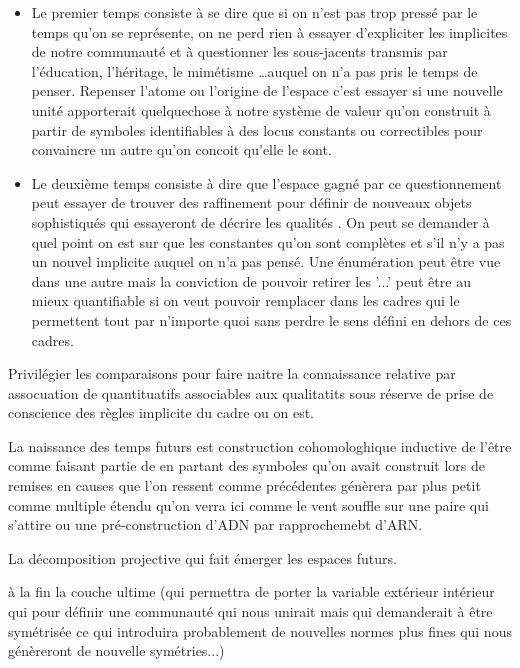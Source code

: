 \documentclass{article}
\begin{document}
\begin{itemize}
\item Le premier temps consiste à se dire que si on n'est pas trop pressé par le temps qu'on se représente, on ne perd rien à essayer d'expliciter  les implicites de notre communauté et à questionner les sous-jacents transmis par l'éducation, l'héritage, le mimétisme \ldots  auquel on n'a pas pris le temps de penser. 
 Repenser l'atome ou l'origine de l'espace c'est essayer si une nouvelle unité apporterait  quelquechose à notre système de valeur qu'on construit à partir de symboles identifiables à des locus constants ou correctibles pour convaincre un autre qu'on concoit  qu'elle le sont.
 \item Le deuxième temps consiste à dire que l'espace gagné par ce questionnement peut essayer de trouver des raffinement pour définir de nouveaux 
objets sophistiqués qui essayeront de décrire les qualités . On peut se demander à quel point on est sur que les constantes qu'on sont complètes et s'il n'y a pas un nouvel implicite auquel on n'a pas pensé. Une énumération peut être vue dans une autre mais la conviction de pouvoir retirer les '...' peut être au mieux quantifiable si on veut pouvoir remplacer dans les cadres qui le permettent tout par n'importe quoi sans perdre le sens défini en dehors de ces cadres.
\end{itemize}

Privilégier les comparaisons pour faire naitre la connaissance relative par assocuation de quantituatifs associables aux qualitatits sous réserve de prise de conscience des règles implicite du cadre ou on est.


La naissance des temps futurs est  construction cohomologhique inductive de l'être comme faisant partie de en partant des symboles qu'on avait construit lors de remises en causes que l'on ressent comme précédentes génèrera par plus petit comme multiple étendu qu'on verra ici comme le vent souffle sur une paire qui s'attire
ou une pré-construction d'ADN par rapprochemebt d'ARN.

La décomposition projective qui fait émerger les espaces futurs.


à la fin la couche ultime (qui permettra de porter la variable extérieur intérieur  qui pour définir une communauté qui nous unirait mais qui demanderait à être symétrisée ce qui introduira probablement de nouvelles normes plus fines qui nous génèreront de nouvelle symétries...)
\end{document}
